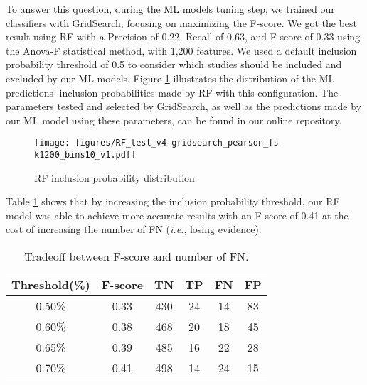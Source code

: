 To answer this question, during the ML models tuning step, we trained our classifiers with GridSearch, focusing on maximizing the F-score. We got the best result using RF with a Precision of 0.22, Recall of 0.63, and F-score of 0.33 using the Anova-F statistical method, with 1,200 features. We used a default inclusion probability threshold of 0.5 to consider which studies should be included and excluded by our ML models. Figure \ref{fig:fig-rf-distribution} illustrates the distribution of the ML predictions' inclusion probabilities made by RF with this configuration. The parameters tested and selected by GridSearch, as well as the predictions made by our ML model using these parameters, can be found in our online repository.



\begin{figure}[ht]
    \centering
    \texttt{[image: figures/RF\_test\_v4-gridsearch\_pearson\_fs-k1200\_bins10\_v1.pdf]}
    \caption{RF inclusion probability distribution}
    \label{fig:fig-rf-distribution}
\end{figure}



Table \ref{tab:rq1-threshold-analysis} shows that by increasing the inclusion probability threshold, our RF model was able to achieve more accurate results with an F-score of 0.41 at the cost of increasing the number of FN (\textit{i.e.}, losing evidence).

\begin{table}[ht]
\centering
\scriptsize
\caption{Tradeoff between F-score and number of FN.}
\label{tab:rq1-threshold-analysis}
\begin{tabular}{|c|c|c|c|c|c|}
\hline
\textbf{Threshold(\%)} & \textbf{F-score} & \textbf{TN} & \textbf{TP} & \textbf{FN} & \textbf{FP} \\
\hline
0.50\% & 0.33 & 430 & 24 & 14 & 83 \\ 
0.60\% & 0.38 & 468 & 20 & 18 & 45 \\  
0.65\% & 0.39 & 485 & 16 & 22 & 28 \\  
0.70\% & 0.41 & 498 & 14 & 24 & 15 \\ 
\hline
\end{tabular}
\end{table}

